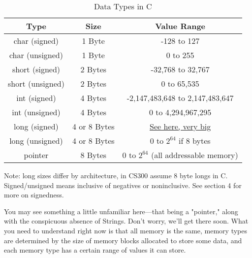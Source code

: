 \documentclass[a4paper, 12pt]{article}
\begin{document}
\begin{flushleft}
	\begin{table}
		\centering
		\begin{threeparttable}
			\label{tab:datatypes}
			\caption{Data Types in C}
			\begin{tabular}{||c c c||}
				\hline
				Type             & Size         & Value Range                                                                               \\ [0.5ex]
				\hline\hline
				char (signed)    & 1 Byte       & -128 to 127                                                                               \\ [1ex]
				char (unsigned)  & 1 Byte       & 0 to 255                                                                                  \\ [1ex]
				short (signed)   & 2 Bytes      & -32,768 to 32,767                                                                         \\ [1ex]
				short (unsigned) & 2 Bytes      & 0 to 65,535                                                                               \\ [1ex]
				int (signed)     & 4 Bytes      & -2,147,483,648 to 2,147,483,647                                                           \\ [1ex]
				int (unsigned)   & 4 Bytes      & 0 to 4,294,967,295                                                                        \\ [1ex]
				long (signed)    & 4 or 8 Bytes & \href{https://www.tutorialspoint.com/c_standard_library/limits_h.htm}{See here, very big} \\ [1ex]
				long (unsigned)  & 4 or 8 Bytes & 0 to $2^{64}$ if 8 bytes                                                                  \\ [1ex]
				pointer          & 8 Bytes      & 0 to $2^{64}$ (all addressable memory)                                                    \\ [1ex]
				\hline
			\end{tabular}
			\begin{tablenotes}
				\small
				\item Note: long sizes differ by architecture, in CS300 assume 8 byte longs in C. Signed/unsigned means inclusive of negatives or noninclusive. See section 4 for more on signedness.
			\end{tablenotes}
		\end{threeparttable}
	\end{table}
	\FloatBarrier

	You may see something a little unfamiliar here---that being a "pointer," along with the conspicuous absence of Strings. Don't worry, we'll get there soon.
	What you need to understand right now is that all memory is the same, memory types are determined by the size of memory blocks
	allocated to store some data, and each memory type has a certain range of values it can store.

\end{flushleft}
\end{document}

